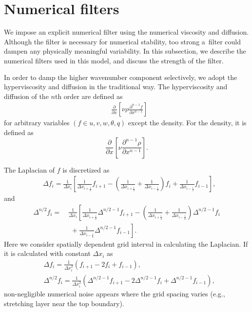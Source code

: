 \section{Numerical filters}
We impose an explicit numerical filter using the numerical viscosity and diffusion.
Although the filter is necessary for numerical stability, too strong a~filter could dampen any physically meaningful variability.
In this subsection, we describe the numerical filters used in this model, and discuss the strength of the filter.


In order to damp the higher wavenumber component selectively, we adopt the hyperviscosity and diffusion in the traditional way.
The hyperviscosity and diffusion of the $n$th order are defined as
\begin{align}
&\frac{\partial }{\partial x}\left[\nu \rho \frac{\partial^{n-1} f}{\partial x^{n-1}}\right] \label{eq:num-diff-def}
\end{align}
for arbitrary variables $(f \in u, v, w, \theta, q)$ except the density. 
For the density, 
it is defined as
$$
  \frac{\partial }{\partial x}\left[\nu \frac{\partial^{n-1} \rho}{\partial x^{n-1}}\right]. 
$$


The Laplacian of $f$ is discretized as
\begin{align}
&\Delta f_i = \frac{1}{\Delta x_i}
\left[
 \frac{1}{\Delta x_{i+\frac{1}{2}}}f_{i+1}
-\left(\frac{1}{\Delta x_{i+\frac{1}{2}}}+\frac{1}{\Delta x_{i-\frac{1}{2}}}\right)f_i
 +\frac{1}{\Delta x_{i-\frac{1}{2}}}f_{i-1}\right],
\end{align}
and
\begin{align}
\Delta^{n/2} f_i =~&\frac{1}{\Delta x_i}
\left[
 \frac{1}{\Delta x_{i+\frac{1}{2}}}\Delta^{n/2-1}f_{i+1}
-\left(\frac{1}{\Delta x_{i+\frac{1}{2}}}+\frac{1}{\Delta x_{i-\frac{1}{2}}}\right)\Delta^{n/2-1}f_i
 \right.\nonumber\\&\left.\,\,+\frac{1}{\Delta x_{i-\frac{1}{2}}}\Delta^{n/2-1}f_{i-1}\right].
   \end{align}
   Here we consider spatially dependent grid interval in calculating
   the Laplacian.  If it is calculated with constant $\Delta x_i$ as
\begin{align}
&\Delta f_i =
  \frac{1}{\Delta x_i^2} \left(f_{i+1} -2f_i +f_{i-1}\right), \\
&  \Delta^{n/2} f_i =
  \frac{1}{\Delta x_i^2} \left(\Delta^{n/2-1}f_{i+1} -2\Delta^{n/2-1}f_i +\Delta^{n/2-1}f_{i-1}\right),
\end{align}
non-negligible numerical noise appears where the grid spacing varies (e.g.,  stretching layer near the top boundary).

